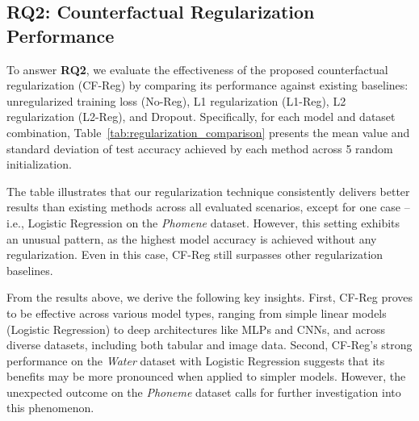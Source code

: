 

\subsection{RQ2: Counterfactual Regularization Performance}
To answer \textbf{RQ2}, we evaluate the effectiveness of the proposed counterfactual regularization (CF-Reg) by comparing its performance against existing baselines: unregularized training loss (No-Reg), L1 regularization (L1-Reg), L2 regularization (L2-Reg), and Dropout.
Specifically, for each model and dataset combination, Table~\ref{tab:regularization_comparison} presents the mean value and standard deviation of test accuracy achieved by each method across 5 random initialization. 

The table illustrates that our regularization technique consistently delivers better results than existing methods across all evaluated scenarios, except for one case -- i.e., Logistic Regression on the \textit{Phomene} dataset. 
However, this setting exhibits an unusual pattern, as the highest model accuracy is achieved without any regularization. Even in this case, CF-Reg still surpasses other regularization baselines.

From the results above, we derive the following key insights. First, CF-Reg proves to be effective across various model types, ranging from simple linear models (Logistic Regression) to deep architectures like MLPs and CNNs, and across diverse datasets, including both tabular and image data. 
Second, CF-Reg's strong performance on the \textit{Water} dataset with Logistic Regression suggests that its benefits may be more pronounced when applied to simpler models. However, the unexpected outcome on the \textit{Phoneme} dataset calls for further investigation into this phenomenon.


